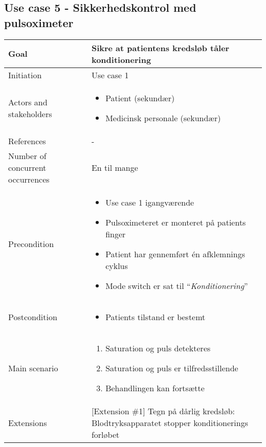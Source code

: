 	\subsection{Use case 5 - Sikkerhedskontrol med pulsoximeter}
		\begin{center}
			\begin{tabular}{ | m{4cm} | m{8cm}| } 
				\hline
				Goal& Sikre at patientens kredsløb tåler konditionering \\ 
				\hline
				Initiation &  Use case 1\\
				\hline
				Actors and stakeholders & 
				\begin{itemize}
					\item Patient (sekundær)
					\item Medicinsk personale (sekundær)
				\end{itemize} \\ 
				\hline
				References & - \\ 
				\hline
				Number of concurrent occurrences & En til mange \\ 
				\hline	
				Precondition & 
				\begin{itemize}
					\item Use case 1 igangværende
					\item Pulsoximeteret er monteret på patients finger
					\item Patient har gennemført én afklemnings cyklus
					\item Mode switch er sat til “\textit{Konditionering}”
 				\end{itemize} \\ 
				\hline
				Postcondition & 
				\begin{itemize}
					\item Patients tilstand er bestemt 
				\end{itemize} \\ 
				\hline
				Main scenario & \begin{enumerate}
					\setlength\itemsep{0cm} %
					\item Saturation og puls detekteres
					\item Saturation og puls er tilfredsstillende
					\subitem [Extension \#1]
					\item Behandlingen kan fortsætte
				\end{enumerate} \\ 
				\hline
				Extensions &  [Extension \#1] Tegn på dårlig kredsløb: Blodtryksapparatet stopper konditionerings forløbet \\ 
				\hline
			\end{tabular}
		\end{center}
			\pagebreak